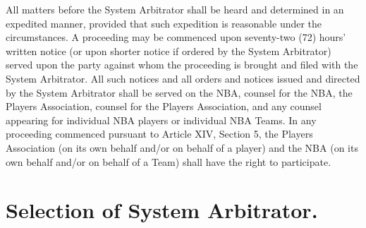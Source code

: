\documentclass[
]{book}
\begin{document}
All matters before the System Arbitrator shall be heard and determined in an expedited manner, provided that such expedition is reasonable under the circumstances. A proceeding may be commenced upon seventy-two (72) hours' written notice (or upon shorter notice if ordered by the System Arbitrator) served upon the party against whom the proceeding is brought and filed with the System Arbitrator. All such notices and all orders and notices issued and directed by the System Arbitrator shall be served on the NBA, counsel for the NBA, the Players Association, counsel for the Players Association, and any counsel appearing for individual NBA players or individual NBA Teams. In any proceeding commenced pursuant to Article XIV, Section 5, the Players Association (on its own behalf and/or on behalf of a player) and the NBA (on its own behalf and/or on behalf of a Team) shall have the right to participate.

\hypertarget{selection-of-system-arbitrator.}{%
\section{Selection of System Arbitrator.}\label{selection-of-system-arbitrator.}}
\end{document}
